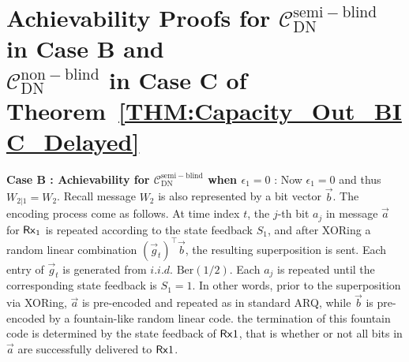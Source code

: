 \section{{Achievability Proofs} for $\mathcal{C}^{\mathrm{semi-blind}}_{\mathrm{DN}}$ in Case B and \\ $\mathcal{C}^{\mathrm{non-blind}}_{\mathrm{DN}}$ in Case C of Theorem~\ref{THM:Capacity_Out_BIC_Delayed}}
\label{Section:Section:Achievability_BIC_DN}

\newcommand{\E}{\mathbb{E}}

\noindent \textbf{Case B : Achievability for $\mathcal{C}^{\mathrm{semi-blind}}_{\mathrm{DN}}$ when $\epsilon_1 = 0$} : Now $\epsilon_1=0$ and thus $W_{2|1}=W_2$. Recall message $W_2$ is also represented by
a bit vector $\vec{b}$. The encoding process come as follows. At time index $t$, the $j$-th bit $a_{j}$ in message $\vec{a}$ for $\mathsf{Rx}_1$ is repeated according to the state feedback $S_1$, and after XORing a random linear combination $(\vec{g}_t)^\intercal \vec{b}$, the resulting superposition is sent. Each entry of $\vec{g}_t$ is generated from $i.i.d.$ $\mathrm{Ber}(1/2)$. Each $a_{j}$ is repeated until the corresponding state feedback is $S_1=1$. In other words, prior to the superposition via XORing, $\vec{a}$ is pre-encoded and repeated as in standard ARQ, while $\vec{b}$ is pre-encoded by a fountain-like random linear code. the termination of this fountain code is determined by the state feedback of $\mathsf{Rx}1$, that is whether or not all bits in $\vec{a}$ are successfully delivered to $\mathsf{Rx}1$.

